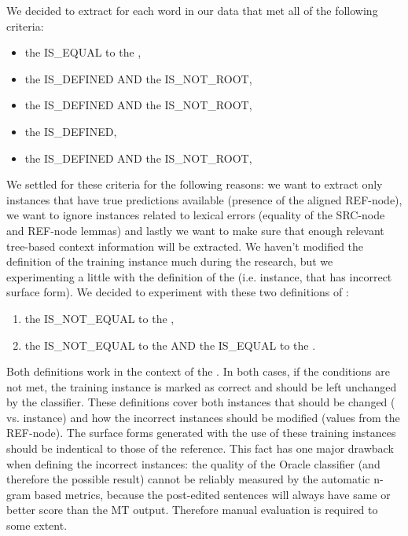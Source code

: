We decided to extract  for each word in our data that met all of the following criteria:
\begin{itemize}
    \item the  IS\_EQUAL to the ,
    \item the  IS\_DEFINED AND the  IS\_NOT\_ROOT,
    \item the  IS\_DEFINED AND the  IS\_NOT\_ROOT,
    \item the  IS\_DEFINED,
    \item the  IS\_DEFINED AND the  IS\_NOT\_ROOT,
\end{itemize}
We settled for these criteria for the following reasons: we want to extract only instances that have true predictions
available (presence of the aligned REF-node), we want to ignore  instances related
to lexical errors (equality of the SRC-node and REF-node lemmas) and lastly we want to make sure that
enough relevant tree-based context information will be extracted. We haven't modified the definition
of the training instance much during the research, but we experimenting a little with the definition
of the  (i.e. instance, that has incorrect surface form).
We decided to experiment with these two definitions of :
\begin{enumerate}
    \item the  IS\_NOT\_EQUAL to the ,
    \item the  IS\_NOT\_EQUAL to the  AND the  IS\_EQUAL to the .
\end{enumerate}
Both definitions work in the context of the . In both cases, if the conditions
are not met, the training instance is marked as correct and should be left unchanged by the classifier.
These definitions cover both instances that should be changed ( vs.  instance)
and how the incorrect instances should be modified (values from the REF-node). The surface forms
generated with the use of these training instances should be indentical to those of the reference.
This fact has one major drawback when defining the incorrect instances:
the quality of the Oracle classifier (and therefore the 
possible result) cannot be reliably measured by the automatic n-gram based metrics, because the post-edited
sentences will always have same or better score than the MT output. Therefore manual evaluation is required
to some extent.

